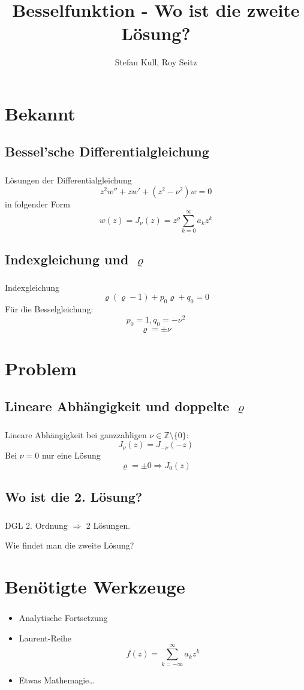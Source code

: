 \documentclass{beamer}
\author{Stefan Kull, Roy Seitz}
\title{Besselfunktion - Wo ist die zweite Lösung?}
\newenvironment{slide}
{\begin{frame}[environment=slide]
	\frametitle{\insertsection}
	\framesubtitle{\insertsubsection}}
{\end{frame}}
\begin{document}
	
	\begin{frame}
		\titlepage
	\end{frame}
	
	\begin{frame}
		\tableofcontents
	\end{frame}
	
\section{Bekannt}	
\subsection{Bessel'sche Differentialgleichung}	
	\begin{slide}
		Lösungen der Differentialgleichung
		$$ z^2w''+zw'+(z^2-\nu^2)w=0 $$
		in folgender Form
		$$
		w(z)=J_\nu(z)=z^\varrho\sum_{k=0}^{\infty}a_kz^k 
		$$
	\end{slide}
	
\subsection{Indexgleichung und $\varrho$}
	\begin{slide}
		Indexgleichung
		$$\varrho(\varrho-1)+p_0\varrho+q_0=0$$
		Für die Besselgleichung:
		$$p_0=1, q_0=-\nu^2$$
		$$\varrho=\pm\nu $$
	\end{slide}

\section{Problem}
\subsection{Lineare Abhängigkeit und doppelte $\varrho$}
	\begin{slide}
		Lineare Abhängigkeit bei ganzzahligen $\nu\in\mathbb{Z}\setminus\{0\}$:
		$$J_\nu(z) = J_{-\nu}(-z)$$
		Bei $\nu=0$ nur eine Lösung
		$$\varrho=\pm 0\Rightarrow J_0(z)$$
	\end{slide}
	
\subsection{Wo ist die 2. Lösung?}
	\begin{slide}		
		DGL 2. Ordnung $\Rightarrow$ 2 Lösungen.
		
		Wie findet man die zweite Lösung?
		
	\end{slide}
	
\section{Benötigte Werkzeuge}
	\begin{slide}
		\begin{itemize}
			\item Analytische Fortsetzung
			\item Laurent-Reihe $$f(z)=\sum_{k=-\infty}^{\infty}a_kz^k $$
			\item Etwas Mathemagie\ldots
		\end{itemize}
	\end{slide}
	
\end{document}
